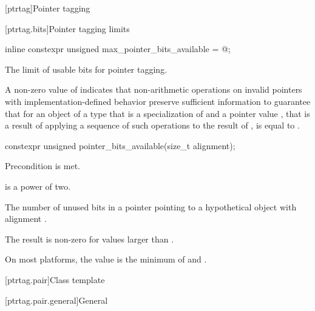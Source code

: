 
[ptrtag]{Pointer tagging}

[ptrtag.bits]{Pointer tagging limits}

%
\begin{itemdecl}
inline constexpr unsigned max_pointer_bits_available = @\seebelow@;
\end{itemdecl}

\begin{itemdescr}
\pnum
The 
limit of usable bits for pointer tagging.

\pnum
\remarks
A non-zero value of  indicates
that non-arithmetic operations on invalid pointers
with implementation-defined behavior
preserve sufficient information to guarantee that
for an object  of a type 
that is a specialization of  and a pointer value ,
that is a result of applying a sequence of such operations
to the result of ,
 is equal to .
\end{itemdescr}

%
\begin{itemdecl}
constexpr unsigned pointer_bits_available(size_t alignment);
\end{itemdecl}

\begin{itemdescr}
\pnum
\constantwhen
Precondition is met.

\pnum
\expects
{} is a power of two.

\pnum
\returns
The 
number of unused bits in a pointer
pointing to a hypothetical object with alignment .

\pnum
\recommended
The result is non-zero for  values larger than .

\pnum
\begin{note}
On most platforms, the value is the minimum of
 and .
\end{note}
\end{itemdescr}

[ptrtag.pair]{Class template }

[ptrtag.pair.general]{General}

